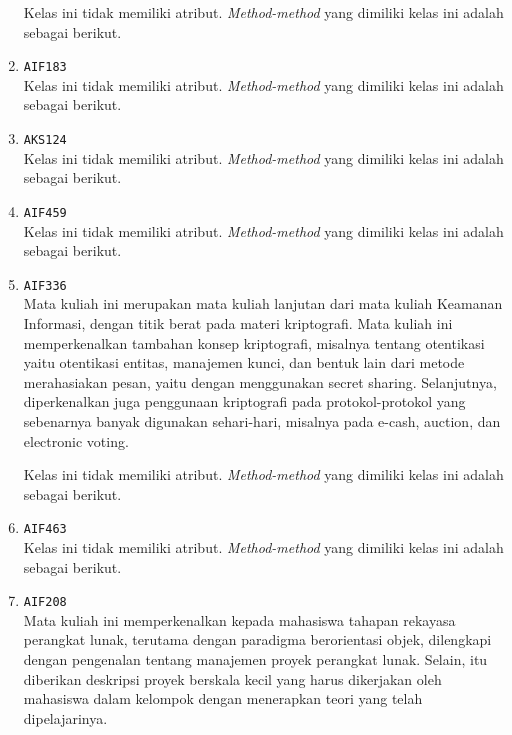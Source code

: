 \documentclass{article}
\begin{document}
\begin{enumerate}
Kelas ini tidak memiliki atribut. \textit{Method-method} yang dimiliki kelas ini adalah sebagai berikut.
\begin{itemize}
\end{itemize}
\item \texttt{AIF183}\\ 
Kelas ini tidak memiliki atribut. \textit{Method-method} yang dimiliki kelas ini adalah sebagai berikut.
\begin{itemize}
\end{itemize}
\item \texttt{AKS124}\\ 
Kelas ini tidak memiliki atribut. \textit{Method-method} yang dimiliki kelas ini adalah sebagai berikut.
\begin{itemize}
\end{itemize}
\item \texttt{AIF459}\\ 
Kelas ini tidak memiliki atribut. \textit{Method-method} yang dimiliki kelas ini adalah sebagai berikut.
\begin{itemize}
\end{itemize}
\item \texttt{AIF336}\\ 
Mata kuliah ini merupakan mata kuliah lanjutan dari mata kuliah Keamanan 
 Informasi, dengan titik berat pada materi kriptografi. Mata kuliah ini 
 memperkenalkan tambahan konsep kriptografi, misalnya tentang otentikasi 
 yaitu otentikasi entitas, manajemen kunci, dan bentuk lain dari metode 
 merahasiakan pesan, yaitu dengan menggunakan secret sharing. Selanjutnya, 
 diperkenalkan juga penggunaan kriptografi pada protokol-protokol yang 
 sebenarnya banyak digunakan sehari-hari, misalnya pada e-cash, auction, 
 dan electronic voting.

Kelas ini tidak memiliki atribut. \textit{Method-method} yang dimiliki kelas ini adalah sebagai berikut.
\begin{itemize}
\end{itemize}
\item \texttt{AIF463}\\ 
Kelas ini tidak memiliki atribut. \textit{Method-method} yang dimiliki kelas ini adalah sebagai berikut.
\begin{itemize}
\end{itemize}
\item \texttt{AIF208}\\ 
Mata kuliah ini memperkenalkan kepada mahasiswa tahapan rekayasa perangkat 
 lunak, terutama dengan paradigma berorientasi objek, dilengkapi dengan 
 pengenalan tentang manajemen proyek perangkat lunak.
 Selain, itu diberikan deskripsi proyek berskala kecil yang harus dikerjakan 
 oleh mahasiswa dalam kelompok dengan menerapkan teori yang telah 
 dipelajarinya.


\end{enumerate}
\end{document}
